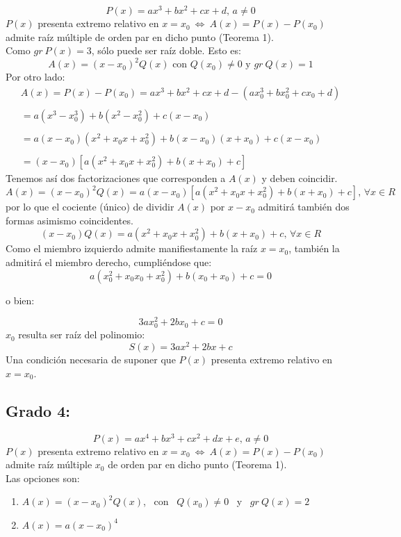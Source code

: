 \documentclass[12pt]{article}
\begin{document}
$$
  P(x)=ax^3+bx^2+cx+d \text{, \ } a \neq 0
$$
$P(x)$ presenta extremo relativo en $x={x}_0 \ \Leftrightarrow \ A(x)=P(x)-P({x}_0)$ admite raíz múltiple de orden par en dicho punto (Teorema 1).\\
Como $gr \ P(x)=3$, sólo puede ser raíz doble. Esto es:
$$
  A(x)=(x-{x}_0)^2 Q(x)\text{ \ con \ }Q({x}_0)\neq0 \text{ \ y \ }gr \ Q(x)=1
$$
Por otro lado:
$$
  \begin{array}{lll}
    A(x)=P(x)-P({x}_0)=ax^3+bx^2+cx+d-(a{x}_0^3+b{x}_0^2+c{x}_0+d)  \\
    \\
    = a(x^3-{x}_0^3)+b(x^2-{x}_0^2)+c(x-{x}_0)                      \\
    \\
    = a(x-{x}_0)(x^2+{x}_0x+{x}_0^2)+b(x-{x}_0)(x+{x}_0)+c(x-{x}_0) \\
    \\
    =(x-{x}_0)[a(x^2+{x}_0x+{x}_0^2)+b(x+{x}_0)+c]
  \end{array}
$$
Tenemos así dos factorizaciones que corresponden a $A(x)$ y deben coincidir.
$$
  A(x)=(x-{x}_0)^2 Q(x)=a(x-{x}_0)[a(x^2+{x}_0x+{x}_0^2)+b(x+{x}_0)+c]\text{, \ }\forall x \in R
$$
por lo que el cociente (único) de dividir $A(x)$ por $x-{x}_0$ admitirá también dos formas asimismo coincidentes.
$$
  (x-{x}_0)Q(x)=a(x^2+{x}_0x+{x}_0^2)+b(x+{x}_0)+c\text{, \ }\forall x \in R
$$
Como el miembro izquierdo admite manifiestamente la raíz $x={x}_0$, también la admitirá el miembro derecho, cumpliéndose que:
$$
  a({x}_0^2+{x}_0{x}_0+{x}_0^2)+b({x}_0+{x}_0)+c =0
$$
\begin{center}
  o bien:
\end{center}
$$
  3a{x}_0^2+2b{x}_0+c=0
$$
${x}_0$ resulta ser raíz del polinomio:
$$
  S(x)=3ax^2+2bx+c
$$
Una condición necesaria de suponer que $P(x)$ presenta extremo relativo en $x={x}_0$.
\\

\subsection*{Grado 4:}
$$
  P(x)=ax^4+bx^3+cx^2+dx+e \text{, \ } a \neq 0
$$
$P(x)$ presenta extremo relativo en $x={x}_0 \ \Leftrightarrow \ A(x)=P(x)-P({x}_0)$ admite raíz múltiple ${x}_0$ de orden par en dicho punto (Teorema 1).\\
Las opciones son:
\begin{enumerate}
  \item $A(x)=(x-{x}_0)^2 Q(x)$, \ con \ $Q({x}_0)\neq0$ \ y \ $gr \ Q(x)=2$

  \item $A(x)=a(x-{x}_0)^4$
\end{enumerate}
\end{document}
